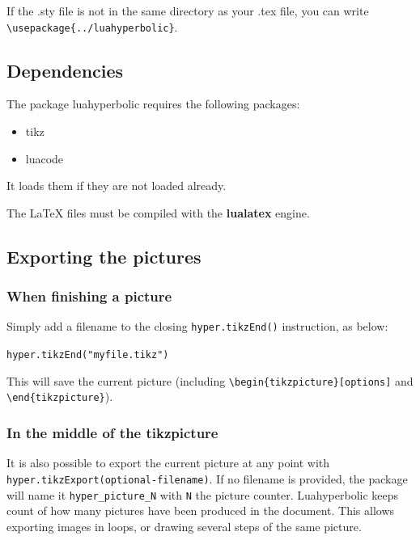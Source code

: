 \documentclass{article}
\begin{document}
If the .sty file is not in the same directory as your .tex file, you can write \verb+\usepackage{../luahyperbolic}+.




\subsection{Dependencies}

The package luahyperbolic  requires the following packages:
\begin{itemize}
\item tikz
\item luacode
\end{itemize}
It loads them if they are not loaded already.

 The LaTeX files must be compiled with the \textbf{lualatex} engine.

 
\subsection{Exporting the pictures}

\subsubsection{When finishing a picture}
Simply add a filename to the closing \texttt{hyper.tikzEnd()} instruction, as below:
\begin{center}
\texttt{hyper.tikzEnd("myfile.tikz")}
\end{center}

This will save the current picture (including \verb+\begin{tikzpicture}[options]+ and \verb+\end{tikzpicture}+).

\subsubsection{In the middle of the tikzpicture}

It is also possible to export the current picture at any point with \verb+hyper.tikzExport(optional-filename)+.
If no filename is provided, the package will name it \verb+hyper_picture_N+ with \texttt{N} the picture counter. Luahyperbolic keeps count of how many pictures have been produced in the document.
This allows exporting images in loops, or drawing several steps of the same picture.
\end{document}
